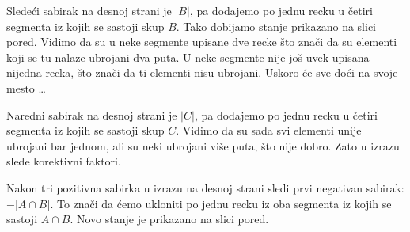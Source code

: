 \medskip

\noindent
\begin{minipage}{3in}
  \hspace*{1.5em}Slede\'ci sabirak na desnoj strani je $|B|$, pa dodajemo po jednu
  recku u \v cetiri segmenta iz kojih se sastoji skup $B$. Tako dobijamo stanje prikazano na slici pored.
  Vidimo da su u neke segmente upisane dve recke \v sto zna\v ci da su elementi koji se tu nalaze ubrojani dva puta.
  U neke segmente nije jo\v s uvek upisana nijedna recka, \v sto zna\v ci da ti elementi nisu ubrojani.
  Uskoro \'ce sve do\'ci na svoje mesto \ldots
\end{minipage}
\hfill
\begin{minipage}{2.5in}
  \begin{center}
    
  \end{center}
\end{minipage}

\medskip

\noindent
\begin{minipage}{3in}
  \hspace*{1.5em}Naredni sabirak na desnoj strani je $|C|$, pa dodajemo po jednu
  recku u \v cetiri segmenta iz kojih se sastoji skup $C$. Vidimo da su sada svi elementi
  unije ubrojani bar jednom, ali su neki ubrojani vi\v se puta, \v sto nije dobro.
  Zato u izrazu slede korektivni faktori.
\end{minipage}
\hfill
\begin{minipage}{2.5in}
  \begin{center}
    
  \end{center}
\end{minipage}

\medskip

\noindent
\begin{minipage}{3in}
  \hspace*{1.5em}Nakon tri pozitivna sabirka u izrazu na desnoj strani sledi prvi negativan sabirak:
  $- |A \cap B|$. To zna\v ci da \'cemo ukloniti po jednu recku iz oba segmenta iz kojih se sastoji $A \cap B$.
  Novo stanje je prikazano na slici pored.
\end{minipage}
\hfill
\begin{minipage}{2.5in}
  \begin{center}
    
  \end{center}
\end{minipage}

\medskip

